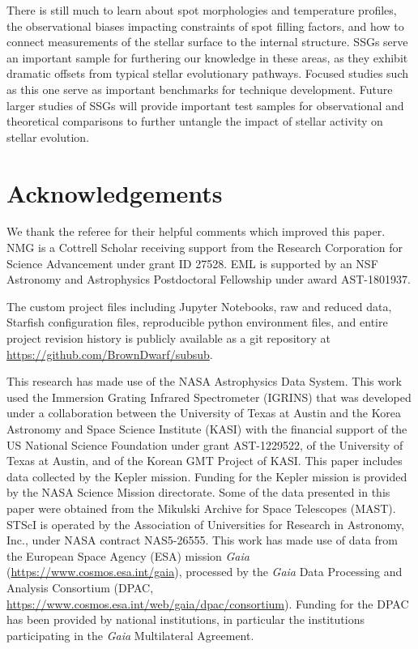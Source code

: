 \documentclass[twocolumn,tighten]{aastex631}
\begin{document}
There is still much to learn about spot morphologies and temperature profiles, the observational biases impacting constraints of spot filling factors, and how to connect measurements of the stellar surface to the internal structure. SSGs serve an important sample for furthering our knowledge in these areas, as they exhibit dramatic offsets from typical stellar evolutionary pathways. Focused studies such as this one serve as important benchmarks for technique development. Future larger studies of SSGs will provide important test samples for observational and theoretical comparisons to further untangle the impact of stellar activity on stellar evolution. 


\section{Acknowledgements}
We thank the referee for their helpful comments which improved this paper. NMG is a Cottrell Scholar receiving support from the Research Corporation for Science Advancement under grant ID 27528. EML is supported by an NSF Astronomy and Astrophysics Postdoctoral Fellowship under award AST-1801937. 

The custom project files including Jupyter Notebooks, raw and reduced data, Starfish configuration files, reproducible python environment files, and entire project revision history is publicly available as a git repository at \url{https://github.com/BrownDwarf/subsub}.  

This research has made use of the NASA Astrophysics Data System. This work used the Immersion Grating Infrared Spectrometer (IGRINS) that was developed under a collaboration between the University of Texas at Austin and the Korea Astronomy and Space Science Institute (KASI) with the financial support of the US National Science Foundation under grant AST-1229522, of the University of Texas at Austin, and of the Korean GMT Project of KASI. This paper includes data collected by the Kepler mission. Funding for the Kepler mission is provided by the NASA Science Mission directorate. Some of the data presented in this paper were obtained from the Mikulski Archive for Space Telescopes (MAST). STScI is operated by the Association of Universities for Research in Astronomy, Inc., under NASA contract NAS5-26555. This work has made use of data from the European Space Agency (ESA) mission {\it Gaia} (\url{https://www.cosmos.esa.int/gaia}), processed by the {\it Gaia} Data Processing and Analysis Consortium (DPAC, \url{https://www.cosmos.esa.int/web/gaia/dpac/consortium}). Funding for the DPAC has been provided by national institutions, in particular the institutions participating in the {\it Gaia} Multilateral Agreement.
\end{document}
